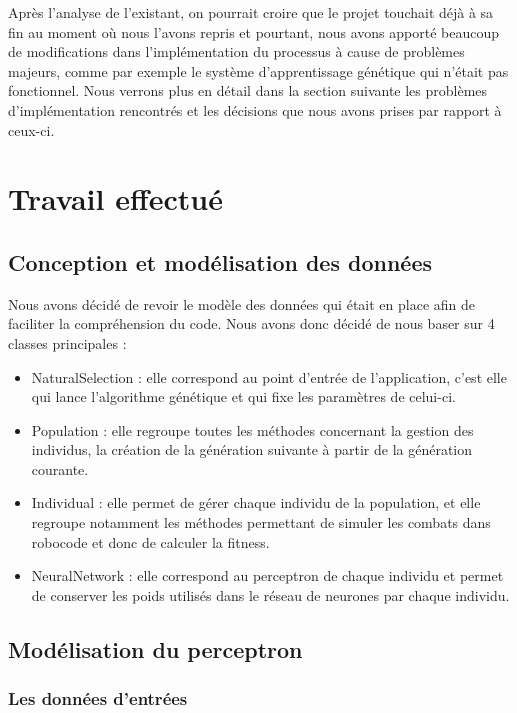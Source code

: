 \documentclass[a4paper,11pt]{article}
\begin{document}
Après l'analyse de l'existant, on pourrait croire que le projet touchait déjà à sa fin au moment où nous l'avons repris et pourtant, nous avons apporté beaucoup de modifications dans l'implémentation du processus à cause de problèmes majeurs, comme par exemple le système d'apprentissage génétique qui n'était pas fonctionnel. Nous verrons plus en détail dans la section suivante les problèmes d'implémentation rencontrés et les décisions que nous avons prises par rapport à ceux-ci.



\section{Travail effectué}

\subsection{Conception et modélisation des données}
Nous avons décidé de revoir le modèle des données qui était en place afin de faciliter la compréhension du code. Nous avons donc décidé de nous baser sur 4 classes principales : 

\begin{itemize}
    \item NaturalSelection : elle correspond au point d'entrée de l'application, c'est elle qui lance l'algorithme génétique et qui fixe les paramètres de celui-ci.
    \item Population : elle regroupe toutes les méthodes concernant la gestion des individus, la création de la génération suivante à partir de la génération courante.
    \item Individual : elle permet de gérer chaque individu de la population, et elle regroupe notamment les méthodes permettant de simuler les combats dans robocode et donc de calculer la fitness.
    \item NeuralNetwork : elle correspond au perceptron de chaque individu et permet de conserver les poids utilisés dans le réseau de neurones par chaque individu.
\end{itemize}





\subsection{Modélisation du perceptron}

\subsubsection{Les données d'entrées}
\end{document}
